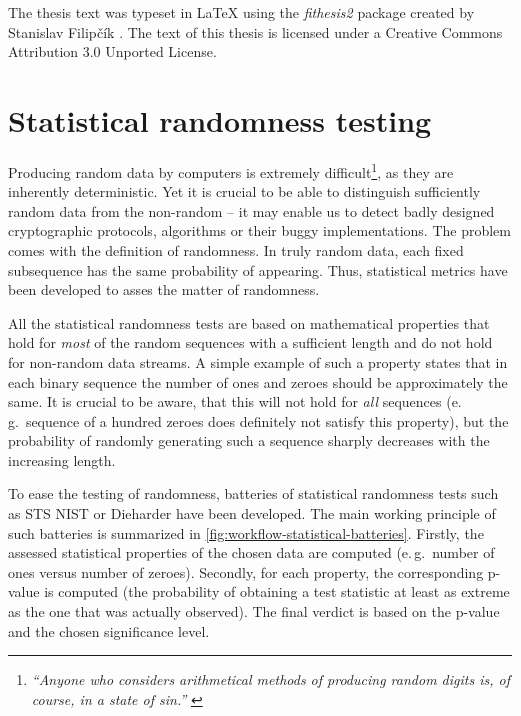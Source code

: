 \documentclass[12pt,twoside]{fithesis2}		%
\renewcommand{\_}{\leavevmode \kern0.0em\vbox{\hrule width0.4em}}
\begin{document}
The thesis text was typeset in \LaTeX{} using the \textit{fithesis2} package created by Stanislav Filipčík \parencite{fithesis}.
The text of this thesis is licensed under a Creative Commons Attribution 3.0 Unported License.

\chapter{Statistical randomness testing}
\label{chap:stat-rand-testing}

Producing random data by computers is extremely difficult\footnote{\textit{``Anyone who considers arithmetical methods of producing 
random digits is, of course, in a state of sin.''} \parencite{neumann-random}}, as they are inherently deterministic.
Yet it is crucial to be able to distinguish sufficiently random data from the non-random -- it may enable us
to detect badly designed cryptographic protocols, algorithms or their buggy implementations.
The problem comes with the definition of randomness. In truly random data, each fixed subsequence 
has the same probability of appearing. Thus, statistical metrics have been developed to asses the matter of randomness.

All the statistical randomness tests are based on mathematical properties that hold for
\textit{most} of the random sequences with a sufficient length and do not hold for non-random data streams.
A simple example of such a property states that in each binary sequence the number of ones and zeroes should be 
approximately the same. It is crucial to be aware, that this will not hold for \textit{all} sequences (e.\,g.\ sequence of 
a hundred zeroes does definitely not satisfy this property),
but the probability of randomly generating such a sequence sharply decreases with the increasing length.

To ease the testing of randomness, batteries of statistical randomness tests such as STS NIST or Dieharder have been developed. 
The main working principle of such batteries is summarized in \autoref{fig:workflow-statistical-batteries}. 
Firstly, the assessed statistical properties of the chosen data are computed (e.\,g.\ number of ones versus number of zeroes). 
Secondly, for each property, the corresponding p-value is computed
(the probability of obtaining a test statistic at least as extreme as the one that was actually observed).
The final verdict is based on the p-value and the chosen significance level.
\end{document}
